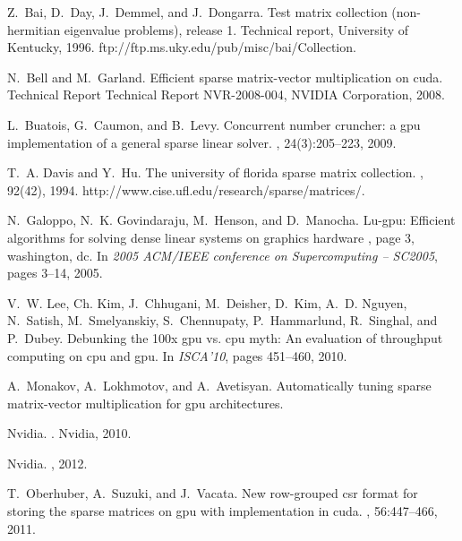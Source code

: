 \documentclass{pj}
\begin{document}
\begin{thebibliography}{99}

Z.~Bai, D.~Day, J.~Demmel, and J.~Dongarra.
\newblock Test matrix collection (non-hermitian eigenvalue problems), release
  1.
\newblock Technical report, University of Kentucky, 1996.
\newblock ftp://ftp.ms.uky.edu/pub/misc/bai/Collection.

N.~Bell and M.~Garland.
\newblock Efficient sparse matrix-vector multiplication on cuda.
\newblock Technical Report Technical Report NVR-2008-004, NVIDIA Corporation,
  2008.

L.~Buatois, G.~Caumon, and B.~Levy.
\newblock Concurrent number cruncher: a gpu implementation of a general sparse
  linear solver.
, 24(3):205--223, 2009.

T.~A. Davis and Y.~Hu.
\newblock The university of florida sparse matrix collection.
, 92(42), 1994.
\newblock http://www.cise.ufl.edu/research/sparse/matrices/.

N.~Galoppo, N.~K. Govindaraju, M.~Henson, and D.~Manocha.
\newblock Lu-gpu: Efficient algorithms for solving dense linear systems on
  graphics hardware , page 3, washington, dc.
\newblock In {\em 2005 ACM/IEEE conference on Supercomputing – SC2005}, pages
  3--14, 2005.

V.~W. Lee, Ch. Kim, J.~Chhugani, M.~Deisher, D.~Kim, A.~D. Nguyen, N.~Satish,
  M.~Smelyanskiy, S.~Chennupaty, P.~Hammarlund, R.~Singhal, and P.~Dubey.
\newblock Debunking the 100x gpu vs. cpu myth: An evaluation of throughput
  computing on cpu and gpu.
\newblock In {\em ISCA’10}, pages 451--460, 2010.

A.~Monakov, A.~Lokhmotov, and A.~Avetisyan.
\newblock Automatically tuning sparse matrix-vector multiplication for gpu
  architectures.

Nvidia.
.
\newblock Nvidia, 2010.

Nvidia.
, 2012.

T.~Oberhuber, A.~Suzuki, and J.~Vacata.
\newblock New row-grouped csr format for storing the sparse matrices on gpu
  with implementation in cuda.
, 56:447--466, 2011.


\end{thebibliography}
\end{document}
